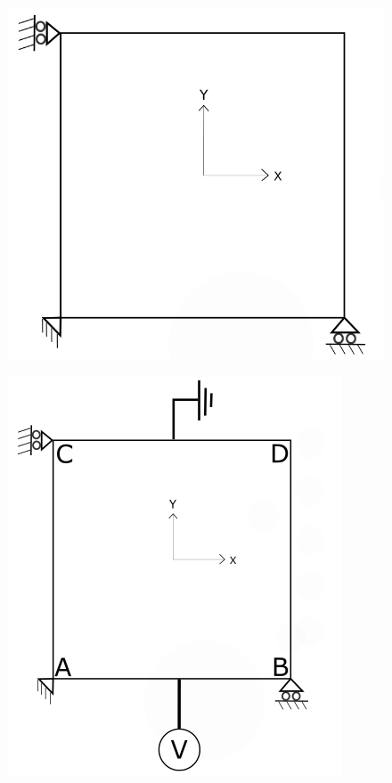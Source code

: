 \documentclass[12pt]{article}
\begin{document}
\begin{figure}[H]
	\centering
	\begin{minipage}{.4\textwidth}
		\centering
		\includegraphics[width=0.8\linewidth]{2DPlate.png}
		\label{2Dplate}
	\end{minipage}%
	\begin{minipage}{.4\textwidth}
		\centering
		\includegraphics[width=1\linewidth]{PureElectrical.png}
		\label{PureElectrical22}
	\end{minipage}
\end{figure}
\end{document}
